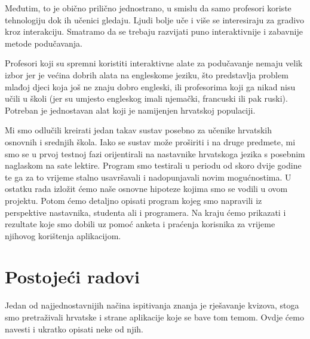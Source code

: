 \documentclass{scrreprt}
\begin{document}
Međutim, to je obično prilično jednostrano, u smislu da samo profesori koriste
tehnologiju dok ih učenici gledaju. Ljudi bolje uče i više se interesiraju za
gradivo kroz interakciju. Smatramo da se trebaju razvijati puno interaktivnije i
zabavnije metode podučavanja.

Profesori koji su spremni koristiti interaktivne alate za podučavanje nemaju velik
izbor jer je većina dobrih alata na engleskome jeziku, što predstavlja problem
mlađoj djeci koja još ne znaju dobro engleski, ili profesorima koji ga nikad
nisu učili u školi (jer su umjesto engleskog imali njemački, francuski ili pak
ruski). Potreban je jednostavan alat koji je namijenjen hrvatskoj populaciji.

Mi smo odlučili kreirati jedan takav sustav posebno za učenike hrvatskih
osnovnih i srednjih škola. Iako se sustav može proširiti i na druge predmete,
mi smo se u prvoj testnoj fazi orijentirali na nastavnike hrvatskoga jezika s
posebnim naglaskom na sate lektire. Program smo testirali u periodu od skoro
dvije godine te ga za to vrijeme stalno usavršavali i nadopunjavali novim
mogućnostima. U ostatku rada izložit ćemo naše osnovne hipoteze kojima smo se
vodili u ovom projektu. Potom ćemo detaljno opisati program kojeg smo napravili
iz perspektive nastavnika, studenta ali i programera. Na kraju ćemo prikazati i
rezultate koje smo dobili uz pomoć anketa i praćenja korisnika za vrijeme
njihovog korištenja aplikacijom.

\section{Postojeći radovi}

Jedan od najjednostavnijih načina ispitivanja znanja je rješavanje kvizova,
stoga smo pretraživali hrvatske i strane aplikacije koje se bave tom temom.
Ovdje ćemo navesti i ukratko opisati neke od njih.
\end{document}
